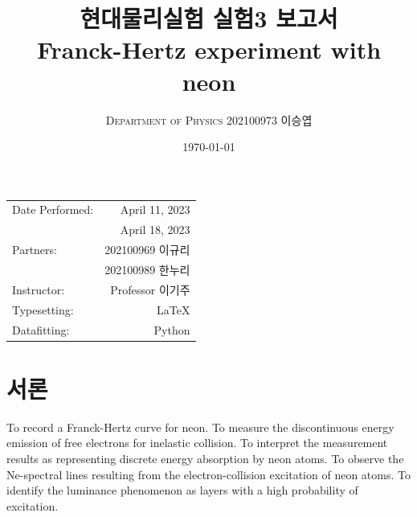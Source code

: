 \documentclass[a4paper, 10pt, nanum]{CSUniSchoolLabReport}
\title{현대물리실험 실험3 보고서 \\ Franck-Hertz experiment with neon} %
\author{\textsc{Department of Physics} 202100973 이승엽}
\date{\today}
\begin{document}
\maketitle %

\begin{center}
	\begin{tabular}{l r}
		Date Performed: & April 11, 2023 \\ %
		& April 18, 2023 \\
		Partners: & 202100969 이규리 \\ %
		& 202100989 한누리 \\
		Instructor: & Professor 이기주 \\ %
		Typesetting: & LaTeX \\
		Datafitting: & Python \\
	\end{tabular}
\end{center}


\maketitle


\section{서론}

  To record a Franck-Hertz curve for neon. To measure the discontinuous energy emission of free electrons for inelastic collision. To interpret the measurement results as representing discrete energy absorption by neon atoms. To observe the Ne-spectral lines resulting from the electron-collision excitation of neon atoms. To identify the luminance phenomenon as layers with a high probability of excitation. 

\end{document}
